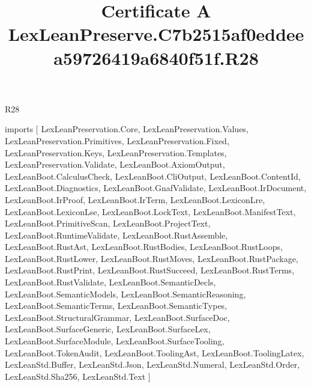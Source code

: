 \begin{lexlean}{R28}
\title{Certificate A LexLeanPreserve.C7b2515af0eddeea59726419a6840f51f.R28}
\begin{coremodule}
imports [
  LexLeanPreservation.Core,
  LexLeanPreservation.Values,
  LexLeanPreservation.Primitives,
  LexLeanPreservation.Fixed,
  LexLeanPreservation.Keys,
  LexLeanPreservation.Templates,
  LexLeanPreservation.Validate,
  LexLeanBoot.AxiomOutput,
  LexLeanBoot.CalculusCheck,
  LexLeanBoot.CliOutput,
  LexLeanBoot.ContentId,
  LexLeanBoot.Diagnostics,
  LexLeanBoot.GnafValidate,
  LexLeanBoot.IrDocument,
  LexLeanBoot.IrProof,
  LexLeanBoot.IrTerm,
  LexLeanBoot.LexiconLre,
  LexLeanBoot.LexiconLse,
  LexLeanBoot.LockText,
  LexLeanBoot.ManifestText,
  LexLeanBoot.PrimitiveScan,
  LexLeanBoot.ProjectText,
  LexLeanBoot.RuntimeValidate,
  LexLeanBoot.RustAssemble,
  LexLeanBoot.RustAst,
  LexLeanBoot.RustBodies,
  LexLeanBoot.RustLoops,
  LexLeanBoot.RustLower,
  LexLeanBoot.RustMoves,
  LexLeanBoot.RustPackage,
  LexLeanBoot.RustPrint,
  LexLeanBoot.RustSucceed,
  LexLeanBoot.RustTerms,
  LexLeanBoot.RustValidate,
  LexLeanBoot.SemanticDecls,
  LexLeanBoot.SemanticModels,
  LexLeanBoot.SemanticReasoning,
  LexLeanBoot.SemanticTerms,
  LexLeanBoot.SemanticTypes,
  LexLeanBoot.StructuralGrammar,
  LexLeanBoot.SurfaceDoc,
  LexLeanBoot.SurfaceGeneric,
  LexLeanBoot.SurfaceLex,
  LexLeanBoot.SurfaceModule,
  LexLeanBoot.SurfaceTooling,
  LexLeanBoot.TokenAudit,
  LexLeanBoot.ToolingAst,
  LexLeanBoot.ToolingLatex,
  LexLeanStd.Buffer,
  LexLeanStd.Json,
  LexLeanStd.Numeral,
  LexLeanStd.Order,
  LexLeanStd.Sha256,
  LexLeanStd.Text
]


\end{coremodule}
\end{lexlean}
